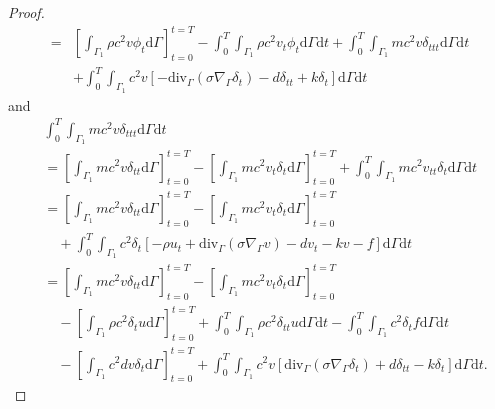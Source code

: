 \documentclass[10pt]{elsarticle}
\begin{document}
\begin{proof}
\begin{equation}
\begin{split}
=&\left[\int_{\Gamma_1}\rho c^{2}v  {\phi_t}\mathrm{d}\Gamma\right]_{t=0}^{t=T} - \int_{0}^{T}\int_{\Gamma_1}\rho c^{2}v_{t}  {\phi_t}\mathrm{d}\Gamma \mathrm{d}t + \int_{0}^{T}\int_{\Gamma_1}m c^{2}v  {\delta}_{ttt}\mathrm{d}\Gamma \mathrm{d}t \\
&+\int_{0}^{T}\int_{\Gamma_1}c^{2}v\left[- \mathrm{div}_{\Gamma}\left(\sigma\nabla_{\Gamma} {\delta_t}\right)  - d {\delta}_{tt} + k {\delta_t} \right]\mathrm{d}\Gamma \mathrm{d}t
\end{split}
\end{equation}
and
\begin{equation} \label{explicit_3}
\begin{split}
 &\int_{0}^{T}\int_{\Gamma_1}m c^{2}v {\delta}_{ttt}\mathrm{d}\Gamma \mathrm{d}t \\
 &= \left[\int_{\Gamma_1}m c^{2}v  {\delta}_{tt}\mathrm{d}\Gamma\right]_{t=0}^{t=T} - \left[\int_{\Gamma_1}m c^{2}v_{t}  {\delta_t}\mathrm{d}\Gamma\right]_{t=0}^{t=T} + \int_{0}^{T}\int_{\Gamma_1}m c^{2}v_{tt}  {\delta_t}\mathrm{d}\Gamma \mathrm{d}t\\
 &= \left[\int_{\Gamma_1}m c^{2}v  {\delta}_{tt}\mathrm{d}\Gamma\right]_{t=0}^{t=T} - \left[\int_{\Gamma_1}m c^{2}v_{t}  {\delta_t}\mathrm{d}\Gamma\right]_{t=0}^{t=T} \\
 &\quad+ \int_{0}^{T}\int_{\Gamma_1} c^{2}  {\delta_t}\left[ -\rho u_{t} + \mathrm{div}_{\Gamma}\left(\sigma\nabla_{\Gamma} {v}\right) -d v_{t} - k v - f\right]\mathrm{d}\Gamma \mathrm{d}t\\
  &=  \left[\int_{\Gamma_1}m c^{2}v  {\delta}_{tt}\mathrm{d}\Gamma\right]_{t=0}^{t=T} - \left[\int_{\Gamma_1}m c^{2}v_{t}  {\delta_t}\mathrm{d}\Gamma\right]_{t=0}^{t=T} \\
  &\quad -\left[\int_{\Gamma_1}\rho c^{2}  {\delta_t} u\mathrm{d}\Gamma\right]_{t=0}^{t=T} + \int_{0}^{T}\int_{\Gamma_1}\rho c^{2}  {\delta}_{tt} u\mathrm{d}\Gamma \mathrm{d}t - \int_{0}^{T}\int_{\Gamma_1}c^{2}\delta_t f\mathrm{d}\Gamma \mathrm{d}t\\
 &\quad -\left[\int_{\Gamma_1} c^{2} d {v}\delta_t\mathrm{d}\Gamma \right]_{t=0}^{t=T}+ \int_{0}^{T}\int_{\Gamma_1} c^{2}  {v}\left[ \mathrm{div}_{\Gamma}\left(\sigma\nabla_{\Gamma} {\delta_t}\right) + d \delta_{tt} - k \delta_t\right]\mathrm{d}\Gamma \mathrm{d}t.
 \end{split}
\end{equation}


\end{proof}
\end{document}
